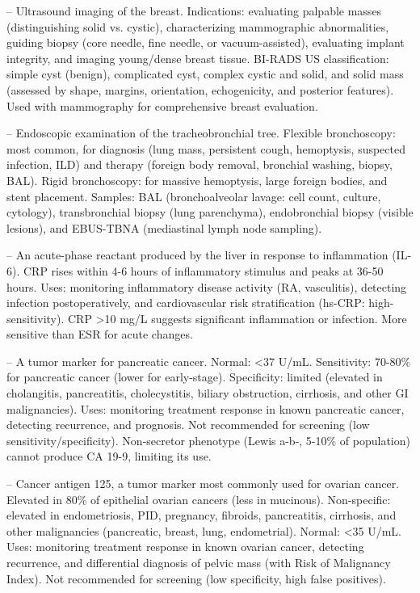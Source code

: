 -- Ultrasound imaging of the breast. Indications: evaluating palpable masses (distinguishing solid vs. cystic), characterizing mammographic abnormalities, guiding biopsy (core needle, fine needle, or vacuum-assisted), evaluating implant integrity, and imaging young/dense breast tissue. BI-RADS US classification: simple cyst (benign), complicated cyst, complex cystic and solid, and solid mass (assessed by shape, margins, orientation, echogenicity, and posterior features). Used with mammography for comprehensive breast evaluation.

-- Endoscopic examination of the tracheobronchial tree. Flexible bronchoscopy: most common, for diagnosis (lung mass, persistent cough, hemoptysis, suspected infection, ILD) and therapy (foreign body removal, bronchial washing, biopsy, BAL). Rigid bronchoscopy: for massive hemoptysis, large foreign bodies, and stent placement. Samples: BAL (bronchoalveolar lavage: cell count, culture, cytology), transbronchial biopsy (lung parenchyma), endobronchial biopsy (visible lesions), and EBUS-TBNA (mediastinal lymph node sampling).

-- An acute-phase reactant produced by the liver in response to inflammation (IL-6). CRP rises within 4-6 hours of inflammatory stimulus and peaks at 36-50 hours. Uses: monitoring inflammatory disease activity (RA, vasculitis), detecting infection postoperatively, and cardiovascular risk stratification (hs-CRP: high-sensitivity). CRP >10 mg/L suggests significant inflammation or infection. More sensitive than ESR for acute changes.

-- A tumor marker for pancreatic cancer. Normal: <37 U/mL. Sensitivity: 70-80\% for pancreatic cancer (lower for early-stage). Specificity: limited (elevated in cholangitis, pancreatitis, cholecystitis, biliary obstruction, cirrhosis, and other GI malignancies). Uses: monitoring treatment response in known pancreatic cancer, detecting recurrence, and prognosis. Not recommended for screening (low sensitivity/specificity). Non-secretor phenotype (Lewis a-b-, 5-10\% of population) cannot produce CA 19-9, limiting its use.

-- Cancer antigen 125, a tumor marker most commonly used for ovarian cancer. Elevated in 80\% of epithelial ovarian cancers (less in mucinous). Non-specific: elevated in endometriosis, PID, pregnancy, fibroids, pancreatitis, cirrhosis, and other malignancies (pancreatic, breast, lung, endometrial). Normal: <35 U/mL. Uses: monitoring treatment response in known ovarian cancer, detecting recurrence, and differential diagnosis of pelvic mass (with Risk of Malignancy Index). Not recommended for screening (low specificity, high false positives).

